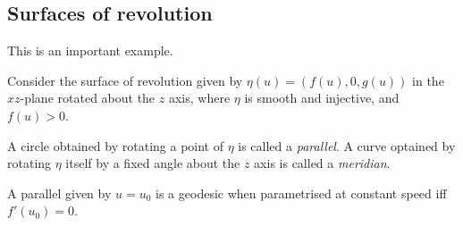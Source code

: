 
\subsection{Surfaces of revolution}
This is an important example.

Consider the surface of revolution given by $\eta(u) = (f(u), 0, g(u))$ in the $xz$-plane rotated about the $z$ axis, where $\eta$ is smooth and injective, and $f(u) > 0$. \\

\begin{definition}
	A circle obtained by rotating a point of $\eta$ is called a \textit{parallel}.
	A curve optained by rotating $\eta$ itself by a fixed angle about the $z$ axis is called a \textit{meridian}.
\end{definition}


\begin{lemma}
	A parallel given by $u = u_0$ is a geodesic when parametrised at constant speed iff $f'(u_0) = 0$.
\end{lemma}

